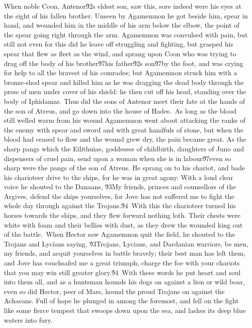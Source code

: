 {When noble Coon, Antenor\'92s eldest son, saw this, sore indeed were his eyes at the sight of his fallen brother. Unseen by Agamemnon he got beside him, spear in hand, and wounded him in the middle of his arm below the elbow, the point of the spear going right through the arm. Agamemnon was convulsed with pain, but still not even for this did he leave off struggling and fighting, but grasped his spear that flew as fleet as the wind, and sprang upon Coon who was trying to drag off the body of his brother\'97his father\'92s son\'97by the foot, and was crying for help to all the bravest of his comrades; but Agamemnon struck him with a bronze-shod spear and killed him as he was dragging the dead body through the press of men under cover of his shield: he then cut off his head, standing over the body of Iphidamas. Thus did the sons of Antenor meet their fate at the hands of the son of Atreus, and go down into the house of Hades.\
As long as the blood still welled warm from his wound Agamemnon went about attacking the ranks of the enemy with spear and sword and with great handfuls of stone, but when the blood had ceased to flow and the wound grew dry, the pain became great. As the sharp pangs which the Eilithuiae, goddesses of childbirth, daughters of Juno and dispensers of cruel pain, send upon a woman when she is in labour\'97even so sharp were the pangs of the son of Atreus. He sprang on to his chariot, and bade his charioteer drive to the ships, for he was in great agony. With a loud clear voice he shouted to the Danaans, \'93My friends, princes and counsellors of the Argives, defend the ships yourselves, for Jove has not suffered me to fight the whole day through against the Trojans.\'94\
With this the charioteer turned his horses towards the ships, and they flew forward nothing loth. Their chests were white with foam and their bellies with dust, as they drew the wounded king out of the battle.\
When Hector saw Agamemnon quit the field, he shouted to the Trojans and Lycians saying, \'93Trojans, Lycians, and Dardanian warriors, be men, my friends, and acquit yourselves in battle bravely; their best man has left them, and Jove has vouchsafed me a great triumph; charge the foe with your chariots that you may win still greater glory.\'94\
With these words he put heart and soul into them all, and as a huntsman hounds his dogs on against a lion or wild boar, even so did Hector, peer of Mars, hound the proud Trojans on against the Achaeans. Full of hope he plunged in among the foremost, and fell on the fight like some fierce tempest that swoops down upon the sea, and lashes its deep blue waters into fury.\
}
